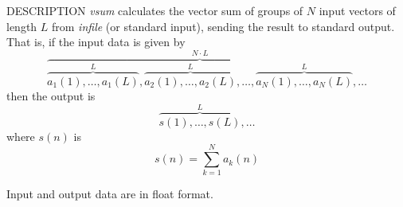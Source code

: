 % 
% 
% 
% 
%                                                                        
%

\begin{synopsis}
\item[vsum] [ --l $L$ ] [ --n $N$ ] [ {\em infile} ]
\end{synopsis}

\begin{qsection}{DESCRIPTION}
{\em vsum} calculates the vector sum of groups of $N$ input vectors 
of length $L$ from {\em infile} (or standard input), 
sending the result to standard output.
That is, if the input data is given by
\begin{displaymath}
\overbrace{
  \overbrace{a_1(1),\dots,a_1(L)}^{L},
  \overbrace{a_2(1),\dots,a_2(L)}^{L},\dots,
  \overbrace{a_N(1),\dots,a_N(L)}^{L}
}^{N \cdot L},\dots
\end{displaymath}
then the output is 
\begin{displaymath}
  \overbrace{s(1),\dots,s(L)}^{L},\dots
\end{displaymath}
where $s(n)$ is
\begin{displaymath}
  s(n)=\sum_{k=1}^{N} a_k(n)
\end{displaymath}

Input and output data are in float format.
\end{qsection}


